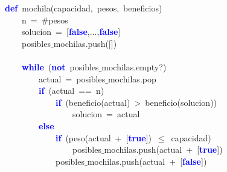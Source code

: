 \noindent
\mbox{}\textbf{\textcolor{Blue}{def}}\ mochila\textcolor{BrickRed}{(}capacidad\textcolor{BrickRed}{,}\ pesos\textcolor{BrickRed}{,}\ beneficios\textcolor{BrickRed}{)} \\
\mbox{}\ \ \ \ n\ \textcolor{BrickRed}{=}\ \#pesos \\
\mbox{}\ \ \ \ solucion\ \textcolor{BrickRed}{=}\ \textcolor{BrickRed}{[}\textbf{\textcolor{Blue}{false}}\textcolor{BrickRed}{,}$\dots$\textcolor{BrickRed}{,}\textbf{\textcolor{Blue}{false}}\textcolor{BrickRed}{]} \\
\mbox{}\ \ \ \ posibles$\_$mochilas\textcolor{BrickRed}{.}push\textcolor{BrickRed}{([])} \\
\mbox{}\ \ \ \  \\
\mbox{}\ \ \ \ \textbf{\textcolor{Blue}{while}}\ \textcolor{BrickRed}{(}\textbf{\textcolor{Blue}{not}}\ posibles$\_$mochilas\textcolor{BrickRed}{.}empty?\textcolor{BrickRed}{)} \\
\mbox{}\ \ \ \ \ \ \ \ actual\ \textcolor{BrickRed}{=}\ posibles$\_$mochilas\textcolor{BrickRed}{.}pop \\
\mbox{}\ \ \ \ \ \ \ \ \textbf{\textcolor{Blue}{if}}\ \textcolor{BrickRed}{(}actual\ \textcolor{BrickRed}{==}\ n\textcolor{BrickRed}{)} \\
\mbox{}\ \ \ \ \ \ \ \ \ \ \ \ \textbf{\textcolor{Blue}{if}}\ \textcolor{BrickRed}{(}beneficio\textcolor{BrickRed}{(}actual\textcolor{BrickRed}{)}\ \textcolor{BrickRed}{\textgreater{}}\ beneficio\textcolor{BrickRed}{(}solucion\textcolor{BrickRed}{))} \\
\mbox{}\ \ \ \ \ \ \ \ \ \ \ \ \ \ \ \ solucion\ \textcolor{BrickRed}{=}\ actual \\
\mbox{}\ \ \ \ \ \ \ \ \textbf{\textcolor{Blue}{else}} \\
\mbox{}\ \ \ \ \ \ \ \ \ \ \ \ \textbf{\textcolor{Blue}{if}}\ \textcolor{BrickRed}{(}peso\textcolor{BrickRed}{(}actual\ \textcolor{BrickRed}{+}\ \textcolor{BrickRed}{[}\textbf{\textcolor{Blue}{true}}\textcolor{BrickRed}{])}\ \textcolor{BrickRed}{$\le$}\ capacidad\textcolor{BrickRed}{)} \\
\mbox{}\ \ \ \ \ \ \ \ \ \ \ \ \ \ \ \ posibles$\_$mochilas\textcolor{BrickRed}{.}push\textcolor{BrickRed}{(}actual\ \textcolor{BrickRed}{+}\ \textcolor{BrickRed}{[}\textbf{\textcolor{Blue}{true}}\textcolor{BrickRed}{])} \\
\mbox{}\ \ \ \ \ \ \ \ \ \ \ \ posibles$\_$mochilas\textcolor{BrickRed}{.}push\textcolor{BrickRed}{(}actual\ \textcolor{BrickRed}{+}\ \textcolor{BrickRed}{[}\textbf{\textcolor{Blue}{false}}\textcolor{BrickRed}{])} \\
